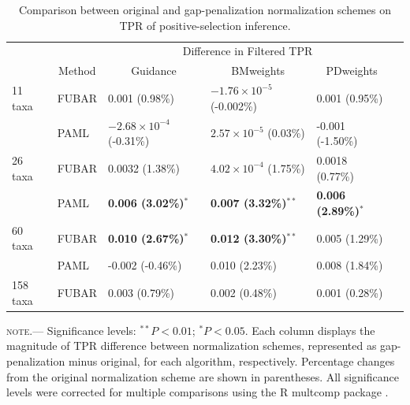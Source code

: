 \documentclass[11pt]{article}
\begin{document}
\begin{table}[H]
\caption {\label{tab:penalmodel} Comparison between original and gap-penalization normalization schemes on TPR of positive-selection inference.}
\begin{tabular}{l l l l l l}
\hline\noalign{\smallskip}
& & \multicolumn{3}{c}{Difference in Filtered TPR} \\
\cline{3-5}\noalign{\smallskip}
\multicolumn{1}{c}{Simulation Set} & \multicolumn{1}{c}{Method} & \multicolumn{1}{c}{Guidance} & \multicolumn{1}{c}{BMweights} & \multicolumn{1}{c}{PDweights} \\
\noalign{\smallskip}\hline\noalign{\smallskip}
11 taxa  & FUBAR & 0.001 (0.98\%) & $-1.76\times10^{-5}$ (-0.002\%) & 0.001 (0.95\%)\\
              & PAML & $-2.68\times10^{-4}$ (-0.31\%) & $2.57\times10^{-5}$ (0.03\%) & -0.001 (-1.50\%)\\
\hline
26 taxa   & FUBAR & 0.0032 (1.38\%) & $4.02\times10^{-4}$ (1.75\%) & 0.0018 (0.77\%)\\
              & PAML & \textbf{0.006 (3.02\%)}$^{\ast}$ & \textbf{0.007 (3.32\%)}$^{\ast\ast}$ & \textbf{0.006 (2.89\%)}$^{\ast}$ \\
\hline
60 taxa  & FUBAR & \textbf{0.010 (2.67\%)}$^{\ast}$ & \textbf{0.012 (3.30\%)}$^{\ast\ast}$  & 0.005  (1.29\%)\\
              & PAML & -0.002 (-0.46\%) & 0.010 (2.23\%) & 0.008 (1.84\%) \\
\hline
158 taxa & FUBAR & 0.003 (0.79\%) & 0.002 (0.48\%) & 0.001 (0.28\%)\\
\hline
\end{tabular}
\newline
\textsc{note.}--- Significance levels: $^{\ast\ast} P < 0.01$; $^{\ast} P < 0.05$. Each column displays the magnitude of TPR difference between normalization schemes, represented as gap-penalization minus original, for each algorithm, respectively. Percentage changes from the original normalization scheme are shown in parentheses. All significance levels were corrected for multiple comparisons using the R multcomp package \citep{Hothorn2008}.
\end{table}

\bigskip
\end{document}
